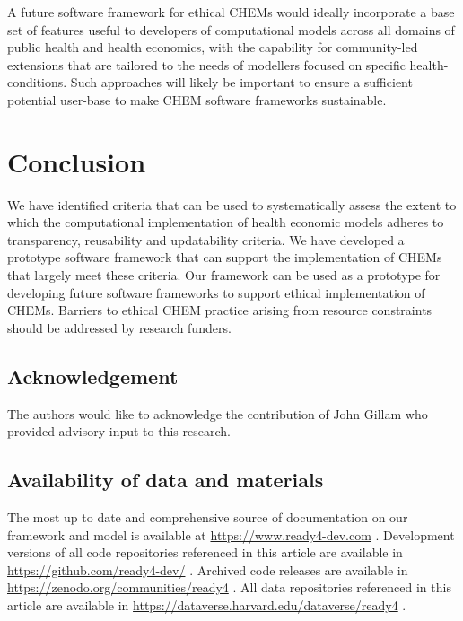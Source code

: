 \documentclass[
]{article}
\begin{document}
A future software framework for ethical CHEMs would ideally incorporate a base set of features useful to developers of computational models across all domains of public health and health economics, with the capability for community-led extensions that are tailored to the needs of modellers focused on specific health-conditions. Such approaches will likely be important to ensure a sufficient potential user-base to make CHEM software frameworks sustainable.

\hypertarget{conclusion}{%
\section{Conclusion}\label{conclusion}}

We have identified criteria that can be used to systematically assess the extent to which the computational implementation of health economic models adheres to transparency, reusability and updatability criteria. We have developed a prototype software framework that can support the implementation of CHEMs that largely meet these criteria. Our framework can be used as a prototype for developing future software frameworks to support ethical implementation of CHEMs. Barriers to ethical CHEM practice arising from resource constraints should be addressed by research funders.

\hypertarget{acknowledgement}{%
\subsection*{Acknowledgement}\label{acknowledgement}}

The authors would like to acknowledge the contribution of John Gillam who provided advisory input to this research.

\hypertarget{availability-of-data-and-materials}{%
\subsection*{Availability of data and materials}\label{availability-of-data-and-materials}}

The most up to date and comprehensive source of documentation on our framework and model is available at \url{https://www.ready4-dev.com} . Development versions of all code repositories referenced in this article are available in \url{https://github.com/ready4-dev/} . Archived code releases are available in \url{https://zenodo.org/communities/ready4} . All data repositories referenced in this article are available in \url{https://dataverse.harvard.edu/dataverse/ready4} .
\end{document}
